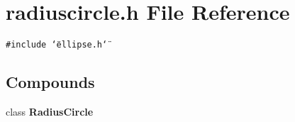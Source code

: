 \section{radiuscircle.h File Reference}
\label{radiuscircle_8h}
{\tt \#include \char`\"{}ellipse.h\char`\"{}}\par
\subsection*{Compounds}
\begin{CompactItemize}
\item 
class {\bf Radius\-Circle}
\end{CompactItemize}
